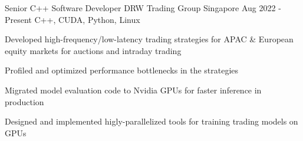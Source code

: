 

\begin{cventries}

  \cventry
    {Senior C++ Software Developer} %
    {DRW Trading Group} %
    {Singapore} %
    {Aug 2022 - Present} %
    {C++, CUDA, Python, Linux} %
    {
      \begin{cvitems} %
        \item {Developed high-frequency/low-latency trading strategies for APAC \& European equity markets for auctions and intraday trading}
        \item {Profiled and optimized performance bottlenecks in the strategies}
        \item {Migrated model evaluation code to Nvidia GPUs for faster inference in production}
        \item {Designed and implemented higly-parallelized tools for training trading models on GPUs}
      \end{cvitems}
    }


\end{cventries}
